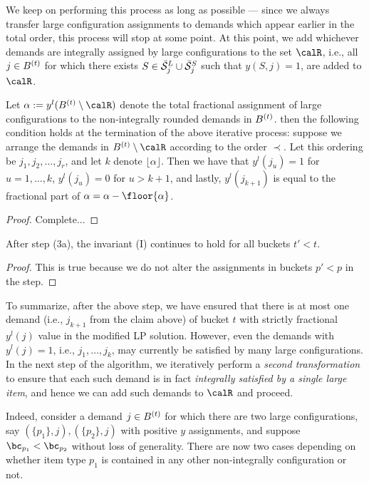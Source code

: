 We keep on performing this process as long as possible --- since we always transfer large configuration assignments to demands which appear earlier in the total order, this process will stop at some point. At this point, we add whichever demands are integrally assigned by large configurations to the set $\calR$, i.e., all $j \in B^{(t)}$ for which there exists $S \in \bar{\cal S}^L_j \cup \bar{\cal S}^S_j$ such that $y(S,j) = 1$, are added to $\calR$. 

\begin{claim}
 Let $\alpha := y^l(B^\brt \setminus \calR)$ denote the total fractional assignment of large configurations to the non-integrally rounded demands in $B^{(t)}$. then the following condition holds at the termination of the above iterative process: suppose we arrange the demands in $B^\brt \setminus \calR$ according to the order $\prec$. Let this ordering be $j_1, j_2, \ldots, j_r$, and let $k$ denote $\lfloor \alpha \rfloor$. Then we have that $y^l(j_u) = 1$ for $u=1, \ldots, k$, $y^l(j_u) = 0$ for $u > k+1$, and lastly, $y^l(j_{k+1})$ is equal to the fractional part of $\alpha = \alpha - \floor{\alpha}$.
 \end{claim}
 
 \begin{proof}
 Complete...
 \end{proof}

\begin{claim}
After step (3a), the invariant (I) continues to hold for all buckets $t' < t$.
\end{claim}

\begin{proof}
This is true because we do not alter the assignments in buckets $p' < p$ in the step.
\end{proof}


To summarize, after the above step, we have ensured that there is at most one demand (i.e., $j_{k+1}$ from the claim above) of bucket $t$
with strictly fractional $y^l(j)$ value in the modified LP solution. However, even the demands with $y^l(j) = 1$, i.e.,  $j_1, \ldots, j_k$,  may currently be satisfied by many large configurations. In the next step of the algorithm, we iteratively perform a \emph{second transformation} to ensure that each such demand is in fact \emph{integrally satisfied by a single large item}, and hence we can add such demands to $\calR$ and proceed.



\medskip {}  
Indeed, consider a  demand $j \in B^{(t)}$ for which there are two large configurations, say $(\{p_1\}, j), (\{p_2\}, j)$ with positive $y$ assignments, and suppose $\bc_{p_1} < \bc_{p_2}$ without loss of generality. There are now two cases depending on whether item type $p_1$ is contained in any other non-integrally configuration or not.

